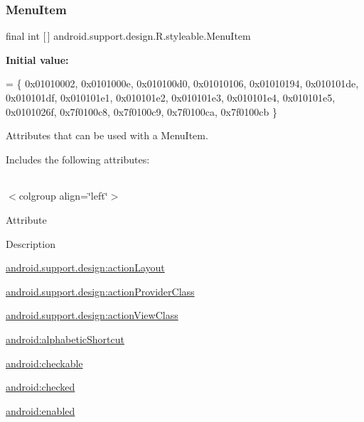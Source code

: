 \subsubsection{\texorpdfstring{Menu\+Item}{MenuItem}}
{\footnotesize\ttfamily final int \mbox{[}$\,$\mbox{]} android.\+support.\+design.\+R.\+styleable.\+Menu\+Item\hspace{0.3cm}{\ttfamily [static]}}

{\bfseries Initial value\+:}
\begin{DoxyCode}
= \{
            0x01010002, 0x0101000e, 0x010100d0, 0x01010106,
            0x01010194, 0x010101de, 0x010101df, 0x010101e1,
            0x010101e2, 0x010101e3, 0x010101e4, 0x010101e5,
            0x0101026f, 0x7f0100c8, 0x7f0100c9, 0x7f0100ca,
            0x7f0100cb
        \}
\end{DoxyCode}
Attributes that can be used with a Menu\+Item. 

Includes the following attributes\+:

\tabulinesep=1mm
\begin{longtabu} spread 0pt [c]{*{0}{|X[-1]}|}
\hline
\end{longtabu}
$<$colgroup align=\char`\"{}left\char`\"{}$>$ 

Attribute

Description 

{\ttfamily \hyperlink{classandroid_1_1support_1_1design_1_1R_1_1styleable_ac3b8f7bd30f9bc1ac057760201dfb65d}{android.\+support.\+design\+:action\+Layout}}

{\ttfamily \hyperlink{classandroid_1_1support_1_1design_1_1R_1_1styleable_a456f32170b14cb7530deba3660c427af}{android.\+support.\+design\+:action\+Provider\+Class}}

{\ttfamily \hyperlink{classandroid_1_1support_1_1design_1_1R_1_1styleable_a0cb751f455c5645ceca6fe5635e01f69}{android.\+support.\+design\+:action\+View\+Class}}

{\ttfamily \hyperlink{classandroid_1_1support_1_1design_1_1R_1_1styleable_a1086898c8f2f36e911f6252adae34a8b}{android\+:alphabetic\+Shortcut}}

{\ttfamily \hyperlink{classandroid_1_1support_1_1design_1_1R_1_1styleable_ae1065c880977606a130948ccb5422e36}{android\+:checkable}}

{\ttfamily \hyperlink{classandroid_1_1support_1_1design_1_1R_1_1styleable_a6ae0844cc817de9df364dfc0a857a864}{android\+:checked}}

{\ttfamily \hyperlink{classandroid_1_1support_1_1design_1_1R_1_1styleable_a209d7c1542d115aa9a96d72d2ac3e24b}{android\+:enabled}}


